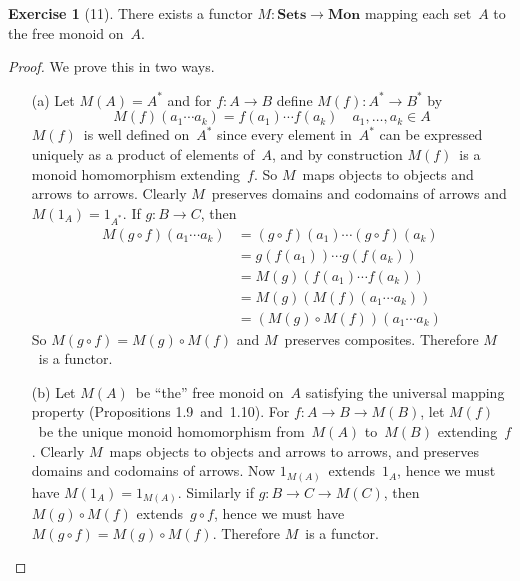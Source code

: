 \documentclass[letterpaper,12pt]{article}
\newcommand{\Sets}{\mathbf{Sets}}
\newcommand{\Mon}{\mathbf{Mon}}
\newcommand{\after}{\circ}
\renewcommand{\star}[1]{#1^{*}}
\theoremstyle{definition}
\newtheorem*{exer}{Exercise}
\theoremstyle{remark}
\theoremstyle{direction}
\begin{document}
\begin{exer}[11]
There exists a functor \(M:\Sets\to\Mon\) mapping each set~\(A\) to the free monoid on~\(A\).
\end{exer}
\begin{proof}
We prove this in two ways.
\begin{enumerate}[itemsep=0pt]
\item[(a)] Let \(M(A)=\star{A}\) and for \(f:A\to B\) define \(M(f):\star{A}\to\star{B}\) by
\[M(f)(a_1\cdots a_k)=f(a_1)\cdots f(a_k)\quad a_1,\ldots,a_k\in A\]
\(M(f)\)~is well defined on~\(\star{A}\) since every element in~\(\star{A}\) can be expressed uniquely as a product of elements of~\(A\), and by construction \(M(f)\)~is a monoid homomorphism extending~\(f\). So \(M\)~maps objects to objects and arrows to arrows. Clearly \(M\)~preserves domains and codomains of arrows and \(M(1_A)=1_{\star{A}}\). If \(g:B\to C\), then
\begin{align*}
M(g\after f)(a_1\cdots a_k)&=(g\after f)(a_1)\cdots(g\after f)(a_k)\\
	&=g(f(a_1))\cdots g(f(a_k))\\
	&=M(g)(f(a_1)\cdots f(a_k))\\
	&=M(g)(M(f)(a_1\cdots a_k))\\
	&=(M(g)\after M(f))(a_1\cdots a_k)
\end{align*}
So \(M(g\after f)=M(g)\after M(f)\) and \(M\)~preserves composites. Therefore \(M\)~is a functor.
\item[(b)] Let \(M(A)\)~be ``the'' free monoid on~\(A\) satisfying the universal mapping property (Propositions 1.9~and~1.10). For \(f:A\to B\to M(B)\), let \(M(f)\)~be the unique monoid homomorphism from~\(M(A)\) to~\(M(B)\) extending~\(f\). Clearly \(M\)~maps objects to objects and arrows to arrows, and preserves domains and codomains of arrows. Now \(1_{M(A)}\)~extends~\(1_A\), hence we must have \(M(1_A)=1_{M(A)}\). Similarly if \(g:B\to C\to M(C)\), then \(M(g)\after M(f)\) extends~\(g\after f\), hence we must have \(M(g\after f)=M(g)\after M(f)\). Therefore \(M\)~is a functor.\qedhere
\end{enumerate}
\end{proof}
\end{document}
